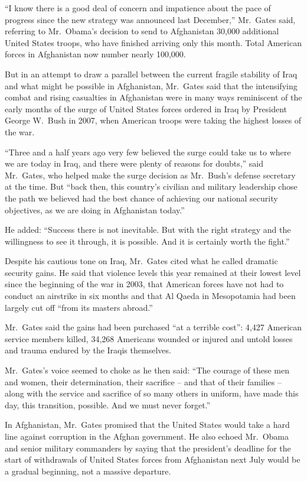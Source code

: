 ﻿\documentclass[12pt]{article}
\begin{document}
``I know there is a good deal of concern and impatience about the pace of progress since the new
strategy was announced last December,'' Mr.~Gates said, referring to Mr.~Obama's decision to send to
Afghanistan 30,000 additional United States troops, who have finished arriving only this month.
Total American forces in Afghanistan now number nearly 100,000.

But in an attempt to draw a parallel between the current fragile stability of Iraq and what might be
possible in Afghanistan, Mr.~Gates said that the intensifying combat and rising casualties in
Afghanistan were in many ways reminiscent of the early months of the surge of United States forces
ordered in Iraq by President George W.~Bush in 2007, when American troops were taking the highest
losses of the war.

``Three and a half years ago very few believed the surge could take us to where we are today in
Iraq, and there were plenty of reasons for doubts,'' said Mr.~Gates, who helped make the surge
decision as Mr.~Bush's defense secretary at the time. But ``back then, this country's civilian and
military leadership chose the path we believed had the best chance of achieving our national
security objectives, as we are doing in Afghanistan today.''

He added: ``Success there is not inevitable. But with the right strategy and the willingness to see
it through, it is possible. And it is certainly worth the fight.''

Despite his cautious tone on Iraq, Mr.~Gates cited what he called dramatic security gains. He said
that violence levels this year remained at their lowest level since the beginning of the war in
2003, that American forces have not had to conduct an airstrike in six months and that Al Qaeda in
Mesopotamia had been largely cut off ``from its masters abroad.''

Mr.~Gates said the gains had been purchased ``at a terrible cost'': 4,427 American service members
killed, 34,268 Americans wounded or injured and untold losses and trauma endured by the Iraqis
themselves.

Mr.~Gates's voice seemed to choke as he then said: ``The courage of these men and women, their
determination, their sacrifice -- and that of their families -- along with the service and sacrifice
of so many others in uniform, have made this day, this transition, possible. And we must never
forget.''

In Afghanistan, Mr.~Gates promised that the United States would take a hard line against corruption
in the Afghan government. He also echoed Mr.~Obama and senior military commanders by saying that the
president's deadline for the start of withdrawals of United States forces from Afghanistan next July
would be a gradual beginning, not a massive departure.
\end{document}

